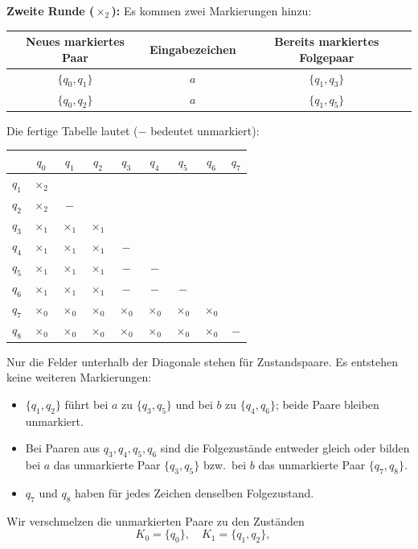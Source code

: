 \begin{loesung}
\begin{enumerate}[a)]
\textbf{Zweite Runde ($\times_2$):} Es kommen zwei Markierungen hinzu:
\begin{center}
\begin{tabular}{c|c|c}
Neues markiertes Paar & Eingabezeichen & Bereits markiertes Folgepaar\\\hline
$\{q_0,q_1\}$ & $a$ & $\{q_1,q_3\}$\\
$\{q_0,q_2\}$ & $a$ & $\{q_1,q_5\}$
\end{tabular}
\end{center}
Die fertige Tabelle lautet ($-$ bedeutet unmarkiert):
\begin{center}
\begin{tabular}{c|cccccccc}
 & $q_0$ & $q_1$ & $q_2$ & $q_3$ & $q_4$ & $q_5$ & $q_6$ & $q_7$\\\hline
$q_1$ & $\times_2$ &  &  &  &  &  &  & \\
$q_2$ & $\times_2$ & $-$ &  &  &  &  &  & \\
$q_3$ & $\times_1$ & $\times_1$ & $\times_1$ &  &  &  &  & \\
$q_4$ & $\times_1$ & $\times_1$ & $\times_1$ & $-$ &  &  &  & \\
$q_5$ & $\times_1$ & $\times_1$ & $\times_1$ & $-$ & $-$ &  &  & \\
$q_6$ & $\times_1$ & $\times_1$ & $\times_1$ & $-$ & $-$ & $-$ &  & \\
$q_7$ & $\times_0$ & $\times_0$ & $\times_0$ & $\times_0$ & $\times_0$ & $\times_0$ & $\times_0$ & \\
$q_8$ & $\times_0$ & $\times_0$ & $\times_0$ & $\times_0$ & $\times_0$ & $\times_0$ & $\times_0$ & $-$\\
\end{tabular}
\end{center}
Nur die Felder unterhalb der Diagonale stehen für Zustandspaare.
Es entstehen keine weiteren Markierungen:
\begin{itemize}
\item $\{q_1,q_2\}$ führt bei $a$ zu $\{q_3,q_5\}$ und bei $b$ zu
$\{q_4,q_6\}$; beide Paare bleiben unmarkiert.
\item Bei Paaren aus $q_3,q_4,q_5,q_6$ sind die Folgezustände entweder gleich
oder bilden bei $a$ das unmarkierte Paar $\{q_3,q_5\}$ bzw.\ bei $b$ das
unmarkierte Paar $\{q_7,q_8\}$.
\item $q_7$ und $q_8$ haben für jedes Zeichen denselben Folgezustand.
\end{itemize}
Wir verschmelzen die unmarkierten Paare zu den Zuständen
\[
K_0=\{q_0\},\quad K_1=\{q_1,q_2\},\quad
\]
\end{enumerate}
\end{loesung}
